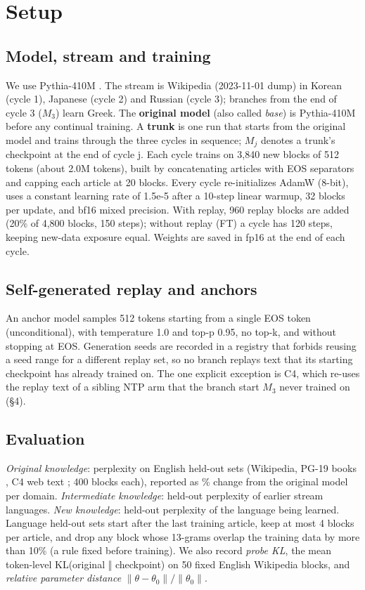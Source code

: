 \documentclass[11pt]{article}
\newcommand{\paramdist}{\ensuremath{\lVert\theta-\theta_0\rVert/\lVert\theta_0\rVert}}
\begin{document}
\section{Setup}

\subsection{Model, stream and training}
We use Pythia-410M \citep{biderman2023}. The stream is Wikipedia (2023-11-01 dump) in Korean (cycle 1), Japanese (cycle 2) and Russian (cycle 3); branches from the end of cycle 3 ($M_3$) learn Greek. The \textbf{original model} (also called \emph{base}) is Pythia-410M before any continual training. A \textbf{trunk} is one run that starts from the original model and trains through the three cycles in sequence; $M_j$ denotes a trunk's checkpoint at the end of cycle j. Each cycle trains on 3,840 new blocks of 512 tokens (about 2.0M tokens), built by concatenating articles with EOS separators and capping each article at 20 blocks. Every cycle re-initializes AdamW (8-bit), uses a constant learning rate of 1.5e-5 after a 10-step linear warmup, 32 blocks per update, and bf16 mixed precision. With replay, 960 replay blocks are added (20\% of 4,800 blocks, 150 steps); without replay (FT) a cycle has 120 steps, keeping new-data exposure equal. Weights are saved in fp16 at the end of each cycle.

\subsection{Self-generated replay and anchors}
An anchor model samples 512 tokens starting from a single EOS token (unconditional), with temperature 1.0 and top-p 0.95, no top-k, and without stopping at EOS. Generation seeds are recorded in a registry that forbids reusing a seed range for a different replay set, so no branch replays text that its starting checkpoint has already trained on. The one explicit exception is C4, which re-uses the replay text of a sibling NTP arm that the branch start $M_3$ never trained on (§4).

\subsection{Evaluation}
\emph{Original knowledge}: perplexity on English held-out sets (Wikipedia, PG-19 books \citep{rae2020}, C4 web text \citep{raffel2020}; 400 blocks each), reported as \% change from the original model per domain. \emph{Intermediate knowledge}: held-out perplexity of earlier stream languages. \emph{New knowledge}: held-out perplexity of the language being learned. Language held-out sets start after the last training article, keep at most 4 blocks per article, and drop any block whose 13-grams overlap the training data by more than 10\% (a rule fixed before training). We also record \emph{probe KL}, the mean token-level KL(original ‖ checkpoint) on 50 fixed English Wikipedia blocks, and \emph{relative parameter distance} \paramdist{}.
\end{document}
